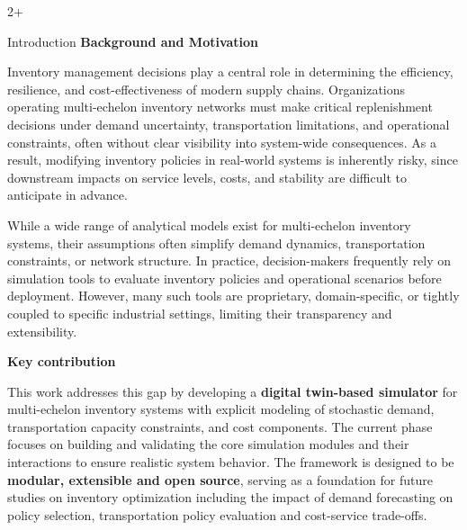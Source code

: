 \documentclass[final]{beamer}
\newlength{\sepwidth}
\newlength{\colwidth}
\begin{document}
\begin{frame}[t]
\begin{columns}[t]
\begin{column}{2\colwidth+\sepwidth}

	\begin{block}{Introduction}
		\textbf{Background and Motivation}  

		Inventory management decisions play a central role in determining the efficiency, resilience, and cost-effectiveness of 
		modern supply chains. Organizations operating multi-echelon inventory networks must make critical replenishment 
		decisions under demand uncertainty, transportation limitations, and operational constraints, often without clear 
		visibility into system-wide consequences. As a result, modifying inventory policies in real-world systems is inherently
		risky, since downstream impacts on service levels, costs, and stability are difficult to anticipate in advance.

		\vspace{0.4em}

		While a wide range of analytical models exist for multi-echelon inventory systems,
		their assumptions often simplify demand dynamics, transportation constraints, or
		network structure. In practice, decision-makers frequently rely on simulation tools
		to evaluate inventory policies and operational scenarios before deployment. However,
		many such tools are proprietary, domain-specific, or tightly coupled to specific
		industrial settings, limiting their transparency and extensibility.

		\vspace{0.4em}

		\textbf{Key contribution}  

		This work addresses this gap by developing a \textbf{digital twin-based simulator} for multi-echelon inventory 
		systems with explicit modeling of stochastic demand, transportation capacity constraints, and cost components. 
		The current phase focuses on building and validating the core simulation modules and their interactions to ensure 
		realistic system behavior. The framework is designed to be \textbf{modular, extensible and open source}, serving as a foundation
		for future studies on inventory optimization including the impact of demand forecasting on policy selection,
		transportation policy evaluation and cost-service trade-offs.

	\end{block}



	\end{column}


\end{columns}
\end{frame}
\end{document}
